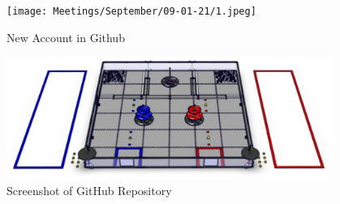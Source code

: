 \begin{figure}[ht]
\centering
\begin{minipage}[b]{.48\textwidth}
  \centering
  \texttt{[image: Meetings/September/09-01-21/1.jpeg]}
  \caption{New Account in Github}
  \label{fig:pic1}
\end{minipage}%
\hfill%
\begin{minipage}[b]{.48\textwidth}
  \centering
  \includegraphics[width=0.95\textwidth]{Meetings/September/09-18-21/field.png}
  \caption{Screenshot of GitHub Repository}
  \label{fig:pic2}
\end{minipage}
\end{figure}












